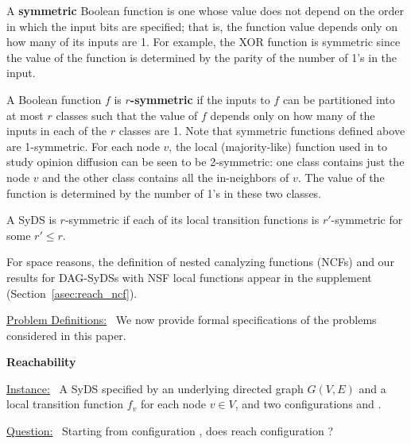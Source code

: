 A \textbf{symmetric} Boolean function is one whose
value does not depend on the order in
which the input bits are specified;
that is, the function value depends only on how many
of its inputs are 1.
For example, the XOR function is symmetric since the 
value of the function is determined by the parity of the number 
of 1's in the input.

A Boolean function $f$ is \textbf{$r$-symmetric}
if the inputs to $f$ can be partitioned into at most $r$ classes
such that the value of $f$ depends only on how many of the
inputs in each of the $r$ classes are 1.
Note that symmetric functions defined above are 1-symmetric.
For each node $v$, the local (majority-like) function 
used in \cite{Chistikov-etal-2020}
to study opinion diffusion can be seen to be 2-symmetric:
one class contains just the node $v$ and the other class
contains all the in-neighbors of $v$.
The value of the function is determined by the number
of 1's in these two classes.

A SyDS is $r$-symmetric
if each of its local transition
functions is $r'$-symmetric for some $r' \leq r$.

For space reasons, the definition of nested canalyzing
functions (NCFs) and our results for DAG-SyDSs
with NSF local functions appear in the supplement
(Section~\ref{asec:reach_ncf}).

\smallskip
\noindent
\underline{\textsf{Problem Definitions:}}~ We now provide
formal specifications of the problems considered in this paper.

\smallskip
\noindent
\textbf{Reachability} %

\smallskip
\noindent
\underline{\textsf{Instance:}}~ A SyDS \cals{} specified 
by an underlying directed
graph $G(V,E)$ and a local transition function $f_v$ for each node $v \in V$,
and two configurations \calc{} and \cald{}. 

\noindent
\underline{\textsf{Question:}}~ Starting from configuration \calc,
does \cals{} reach configuration \cald? 

\iffalse
We observe that \textsc{Reach} is solvable in polynomial time for
any class of SyDSs for which function evaluation can be done in
polynomial time and there is a polynomial bound on the length of a
phase space cycle and the length of a transient.  In such a case,
the given SyDS can be simulated for the required number of steps.
As will be seen, this approach is applicable to NCFs, monotone
functions (with both positive and negative monotone functions allowed
in \cals{}), and bithreshold functions.
\fi

